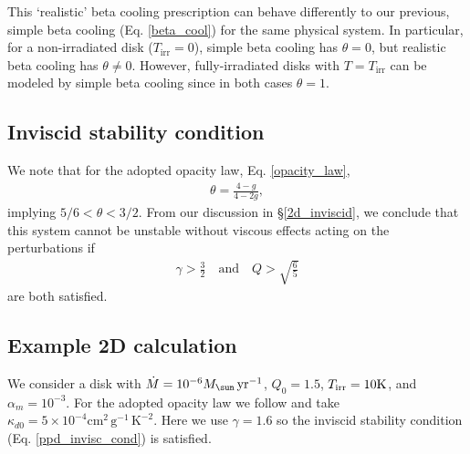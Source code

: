 This `realistic' beta cooling prescription can behave differently to 
our previous, simple beta cooling (Eq. \ref{beta_cool}) for the same
physical system. In particular, for a non-irradiated disk
($T_\mathrm{irr}=0$), simple beta 
cooling has  $\theta=0$, but realistic beta cooling has $\theta\neq
0$. However, fully-irradiated disks with $T=T_\mathrm{irr}$ can be
modeled by simple beta cooling since in both cases $\theta=1$.  




\subsection{Inviscid stability condition} 
We note that for the adopted opacity law, Eq. \ref{opacity_law}, 
\begin{align*}
  \theta = \frac{4-g}{4-2g},
\end{align*}
implying $5/6<\theta<3/2$. 
From our discussion in \S\ref{2d_inviscid}, we conclude that this
system cannot be unstable without
viscous effects acting on the perturbations if 
\begin{align}
  \gamma > \frac{3}{2} \quad \text{and} \quad Q > \sqrt{\frac{6}{5}} \label{ppd_invisc_cond}
\end{align} 
are both satisfied.  

\subsection{Example 2D calculation}\label{pp2d_example}
We consider a disk with $\dot{M} = 10^{-6}M_\sun\,\yr^{-1}$, $Q_0=1.5$, 
$T_\mathrm{irr}=10\mathrm{K}$, and $\alpha_m=10^{-3}$. For the adopted opacity
law we follow \citeauthor{rafikov15} and take $\kappa_{d0} =
5\times10^{-4}\mathrm{cm}^2\,\mathrm{g}^{-1}\,\mathrm{K}^{-2}$. Here we use
$\gamma=1.6$ so the inviscid stability condition
(Eq. \ref{ppd_invisc_cond}) is satisfied. 

